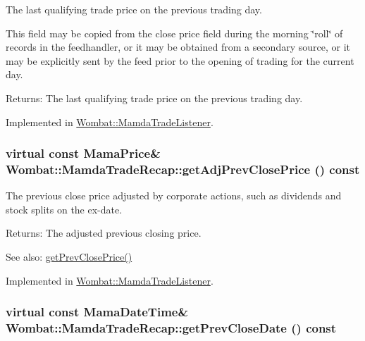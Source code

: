 The last qualifying trade price on the previous trading day. 

This field may be copied from the close price field during the morning \char`\"{}roll\char`\"{} of records in the feedhandler, or it may be obtained from a secondary source, or it may be explicitly sent by the feed prior to the opening of trading for the current day.

\begin{Desc}
\item[Returns:]The last qualifying trade price on the previous trading day. \end{Desc}


Implemented in \hyperlink{classWombat_1_1MamdaTradeListener_7cef846e6625cd78c1c05cd25ea8ee09}{Wombat::Mamda\-Trade\-Listener}.\hypertarget{classWombat_1_1MamdaTradeRecap_6b50a84a3848169713d4110fc6ac1280}{
\subsubsection[getAdjPrevClosePrice]{\setlength{\rightskip}{0pt plus 5cm}virtual const Mama\-Price\& Wombat::Mamda\-Trade\-Recap::get\-Adj\-Prev\-Close\-Price () const}}
\label{classWombat_1_1MamdaTradeRecap_6b50a84a3848169713d4110fc6ac1280}


The previous close price adjusted by corporate actions, such as dividends and stock splits on the ex-date. 

\begin{Desc}
\item[Returns:]The adjusted previous closing price. \end{Desc}
\begin{Desc}
\item[See also:]\hyperlink{classWombat_1_1MamdaTradeRecap_a612fcb5d25ec608317992115fd05349}{get\-Prev\-Close\-Price()} \end{Desc}


Implemented in \hyperlink{classWombat_1_1MamdaTradeListener_e8de0253e81ad8f4e22380854e0a1750}{Wombat::Mamda\-Trade\-Listener}.\hypertarget{classWombat_1_1MamdaTradeRecap_cbe424a55e6fd1e9cd086b9884b7a6fc}{
\subsubsection[getPrevCloseDate]{\setlength{\rightskip}{0pt plus 5cm}virtual const Mama\-Date\-Time\& Wombat::Mamda\-Trade\-Recap::get\-Prev\-Close\-Date () const}}
\label{classWombat_1_1MamdaTradeRecap_cbe424a55e6fd1e9cd086b9884b7a6fc}


